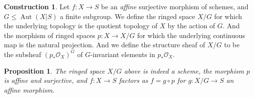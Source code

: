 \documentclass{article}
\theoremstyle{plain}
\newtheorem{proposition}[theorem]{Proposition}
\theoremstyle{definition}
\newtheorem{construction}[theorem]{Construction}
\DeclareMathOperator{\Aut}{Aut}
\begin{document}
\begin{construction}
    Let $f: X\rightarrow S$ be an \textit{affine} surjective morphism of schemes, and $G\leq \Aut(X|S)$ a finite subgroup. 
    We define the ringed space $X/G$ for which the underlying topology is the quotient topology of $X$ by the action of $G$. And the morphism of ringed spaces $p :X\rightarrow X/G$ for which the underlying continuous map is the natural projection.
    And we define the structure sheaf of $X/G$ to be the subsheaf $(p_*\mathcal{O}_X)^G$ of $G$-invariant elements in $p_*\mathcal{O}_X$.
\end{construction}

\begin{proposition}
    The ringed space $X/G$ above is indeed a scheme, the morphism $p$ is affine and surjective, and $f:X\rightarrow S$ factors as $f = g\circ p$ for $g:X/G \rightarrow S$ an affine morphism.
\end{proposition}
\end{document}

